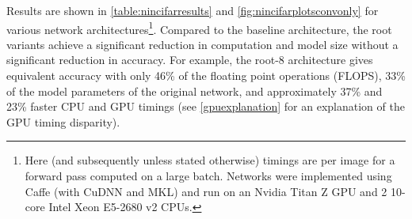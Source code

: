\documentclass[thesis]{subfiles}
\begin{document}
	Results are shown in \cref{table:nincifarresults} and \cref{fig:nincifarplotsconvonly} for various network architectures\footnote{Here (and subsequently unless stated otherwise) timings are per image for a forward pass computed on a large batch. Networks were implemented using Caffe (with CuDNN and MKL) and run on an Nvidia Titan Z GPU and 2 10-core Intel Xeon E5-2680 v2 CPUs.}. Compared to the baseline architecture, the root variants achieve a significant reduction in computation and model size without a significant reduction in accuracy. For example, the root-8 architecture gives equivalent accuracy with only 46\% of the floating point operations (FLOPS), 33\% of the model parameters of the original network, and approximately 37\% and 23\% faster CPU and GPU timings (see \cref{gpuexplanation} for an explanation of the GPU timing disparity).
	
	\newcommand{\covarlabels}[5]{%
		\begin{tikzpicture}[anchor=south west]
		\node [inner sep=0pt] (c)
		{
			#5
		};
		\ifx\covarwidth\undefined
		\newlength{\covarwidth}
		\newlength{\covarheight}
		\fi
		\settowidth{\covarwidth}{#5}
		\settoheight{\covarheight}{#5}
		\path[use as bounding box] (c.south west) rectangle (c.north east);
		\node [anchor=south west, xshift=-0.5em, yshift=-0.5em, rotate=45] at (c.north west) {\footnotesize 0};
		\node [anchor=south east, xshift=\covarwidth, yshift=-0.2em] at (c.north west) {\footnotesize #4};
		\node [anchor=south west, xshift=0.25em, yshift=-1.05\covarheight, rotate=90] at (c.north west) {\footnotesize #2};
		\node [anchor=south, xshift=0.5\covarwidth] at (c.north west) {\footnotesize\texttt{#3}};
		\node [anchor=south, xshift=0.2em, yshift=-0.5\covarheight, rotate=90] at (c.north west) {\footnotesize \texttt{#1}};
		\end{tikzpicture}%
	}
	
\end{document}
